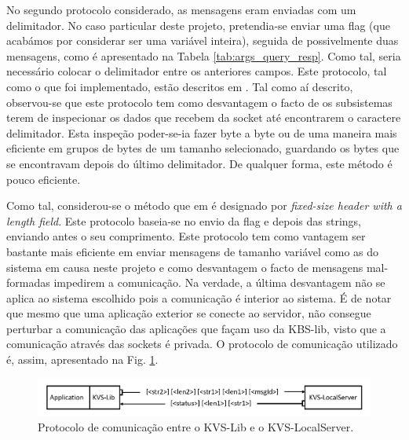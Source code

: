 No segundo protocolo considerado, as mensagens eram enviadas com um delimitador. No caso particular deste projeto, pretendia-se enviar uma flag (que acabámos por considerar ser uma variável inteira), seguida de possivelmente duas mensagens, como é apresentado na Tabela \ref{tab:args_query_resp}. Como tal, seria necessário colocar o delimitador entre os anteriores campos. Este protocolo, tal como o que foi implementado, estão descritos em \parencite[910-911]{guia_linux}. Tal como aí descrito, observou-se que este protocolo tem como desvantagem o facto de os subsistemas terem de inspecionar os dados que recebem da socket até encontrarem o caractere delimitador. Esta inspeção poder-se-ia fazer byte a byte ou de uma maneira mais eficiente em grupos de bytes de um tamanho selecionado, guardando os bytes que se encontravam depois do último delimitador. De qualquer forma, este método é pouco eficiente.

Como tal, considerou-se o método que em \parencite[910]{guia_linux} é designado por \textit{fixed-size header with a length field}. Este protocolo baseia-se no envio da flag e depois das strings, enviando antes o seu comprimento. Este protocolo tem como vantagem ser bastante mais eficiente em enviar mensagens de tamanho variável como as do sistema em causa neste projeto e como desvantagem o facto de mensagens mal-formadas impedirem a comunicação. Na verdade, a última desvantagem não se aplica ao sistema escolhido pois a comunicação é interior ao sistema. É de notar que mesmo que uma aplicação exterior se conecte ao servidor, não consegue perturbar a comunicação das aplicações que façam uso da KBS-lib, visto que a comunicação através das sockets é privada.
O protocolo de comunicação utilizado é, assim, apresentado na Fig. \ref{fig:KVS-Lib-KVS-LocalServer_com}.

\begin{figure}[ht]
    \centering
    \includegraphics[width=\linewidth]{figures/KVS-Lib-KVS-LocalServer_com_protocol.png}
    \caption{Protocolo de comunicação entre o KVS-Lib e o KVS-LocalServer.}
    \label{fig:KVS-Lib-KVS-LocalServer_com}
\end{figure}

